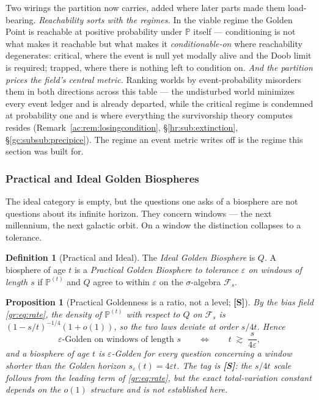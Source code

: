 \documentclass[11pt]{article}
\numberwithin{equation}{section}
\theoremstyle{plain}
\newtheorem{proposition}[theorem]{Proposition}
\theoremstyle{definition}
\newtheorem{definition}[theorem]{Definition}
\theoremstyle{remark}
\newcommand{\PP}{\mathbb{P}}
\begin{document}
Two wirings the partition now carries, added where later parts made
them load-bearing. \emph{Reachability sorts with the regimes.} In the
viable regime the Golden Point is reachable at positive probability
under $\PP$ itself --- conditioning is not what makes it reachable
but what makes it \emph{conditionable-on} where reachability
degenerates: critical, where the event is null yet modally alive and
the Doob limit is required; trapped, where there is nothing left to
condition on. \emph{And the partition prices the field's central
metric.} Ranking worlds by event-probability misorders them in both
directions across this table --- the undisturbed world minimizes
every event ledger and is already departed, while the critical
regime is condemned at probability one and is where everything the
survivorship theory computes resides
(Remark~\ref{ac:rem:losingcondition}, \S\ref{hr:sub:extinction},
\S\ref{gc:subsub:precipice}). The regime an event metric writes off
is the regime this section was built for.

\subsubsection{Practical and Ideal Golden Biospheres}
\label{gr:subsub:practical}

The ideal category is empty, but the questions one asks of a biosphere
are not questions about its infinite horizon. They concern windows ---
the next millennium, the next galactic orbit. On a window the
distinction collapses to a tolerance.

\begin{definition}[Practical and Ideal]\label{gr:def:practical}
The \emph{Ideal Golden Biosphere} is $Q$. A biosphere of age $t$ is a
\emph{Practical Golden Biosphere to tolerance $\varepsilon$ on windows
of length $s$} if $\PP^{(t)}$ and $Q$ agree to within $\varepsilon$ on
the $\sigma$-algebra $\mathcal F_s$.
\end{definition}

\begin{proposition}[Practical Goldenness is a ratio, not a level;
\textbf{[S]}]\label{gr:prop:ratio}
By the bias field \eqref{gr:eq:rate}, the density of $\PP^{(t)}$ with
respect to $Q$ on $\mathcal F_s$ is $(1-s/t)^{-1/4}(1+o(1))$, so the two
laws deviate at order $s/4t$. Hence
\begin{equation}\label{gr:eq:practical}
\text{$\varepsilon$-Golden on windows of length } s
\qquad\Longleftrightarrow\qquad
t\;\gtrsim\;\frac{s}{4\varepsilon},
\end{equation}
and a biosphere of age $t$ is $\varepsilon$-Golden for every question
concerning a window shorter than the \emph{Golden horizon}
$s_\varepsilon(t)=4\varepsilon t$. The tag is \textbf{[S]}: the $s/4t$
scale follows from the leading term of \eqref{gr:eq:rate}, but the exact
total-variation constant depends on the $o(1)$ structure and is not
established here.
\end{proposition}
\end{document}

